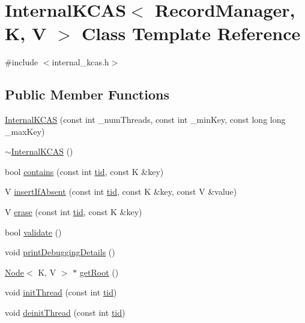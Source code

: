 \hypertarget{classInternalKCAS}{}\section{Internal\+K\+C\+AS$<$ Record\+Manager, K, V $>$ Class Template Reference}
\label{classInternalKCAS}


{\ttfamily \#include $<$internal\+\_\+kcas.\+h$>$}

\subsection*{Public Member Functions}
\begin{DoxyCompactItemize}
\item 
\hyperlink{classInternalKCAS_ac9c322cd3a85b979a08de155c21f67e1}{Internal\+K\+C\+AS} (const int \+\_\+num\+Threads, const int \+\_\+min\+Key, const long long \+\_\+max\+Key)
\item 
\hyperlink{classInternalKCAS_abd61df2bf061536a6565252d31d3f3f3}{$\sim$\+Internal\+K\+C\+AS} ()
\item 
bool \hyperlink{classInternalKCAS_a6cc67a7c0c48dcb3dfc92caf1661caff}{contains} (const int \hyperlink{microbench_2main_8cpp_a9ca9869868fe7e7a38a921cc7de4103f}{tid}, const K \&key)
\item 
V \hyperlink{classInternalKCAS_ab3010217722850563fca996779d44aaf}{insert\+If\+Absent} (const int \hyperlink{microbench_2main_8cpp_a9ca9869868fe7e7a38a921cc7de4103f}{tid}, const K \&key, const V \&value)
\item 
V \hyperlink{classInternalKCAS_a13be8756f4bed1d759d5018aa0d2d380}{erase} (const int \hyperlink{microbench_2main_8cpp_a9ca9869868fe7e7a38a921cc7de4103f}{tid}, const K \&key)
\item 
bool \hyperlink{classInternalKCAS_abbe352f377d39453950e11caf7c5081d}{validate} ()
\item 
void \hyperlink{classInternalKCAS_a03139bf48fad9708cf170f246696870a}{print\+Debugging\+Details} ()
\item 
\hyperlink{classNode}{Node}$<$ K, V $>$ $\ast$ \hyperlink{classInternalKCAS_af0b27ea462939a6e491e0775f4ab0b9e}{get\+Root} ()
\item 
void \hyperlink{classInternalKCAS_ab4fe3ffb3c0839a75a9a4272750d10e4}{init\+Thread} (const int \hyperlink{microbench_2main_8cpp_a9ca9869868fe7e7a38a921cc7de4103f}{tid})
\item 
void \hyperlink{classInternalKCAS_a34b83ecf38951b339abc5e1270d97c84}{deinit\+Thread} (const int \hyperlink{microbench_2main_8cpp_a9ca9869868fe7e7a38a921cc7de4103f}{tid})

\end{DoxyCompactItemize}
